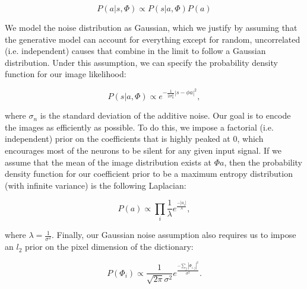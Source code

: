 \begin{equation}\label{eq:ch2_bayes}
    P(a|s,\Phi) \propto P(s|a,\Phi) P(a)
\end{equation}

We model the noise distribution as Gaussian, which we justify by assuming that the generative model can account for everything except for random, uncorrelated (i.e. independent) causes that combine in the limit to follow a Gaussian distribution. Under this assumption, we can specify the probability density function for our image likelihood:

\begin{equation}\label{eq:ch2_image_likelihood}
    P(s|a,\Phi) \propto e^{-\frac{1}{2\sigma_{n}^{2}}|s-\phi a|^{2}},
\end{equation}

\noindent where $\sigma_{n}$ is the standard deviation of the additive noise. Our goal is to encode the images as efficiently as possible. To do this, we impose a factorial (i.e. independent) prior on the coefficients that is highly peaked at 0, which encourages most of the neurons to be silent for any given input signal. If we assume that the mean of the image distribution exists at $\Phi a$, then the probability density function for our coefficient prior to be a maximum entropy distribution (with infinite variance) is the following Laplacian:

\begin{equation}\label{eq:ch2_coefficient_prior}
    P(a) \propto \prod_{i}\frac{1}{\lambda} e^{\frac{-|a_{i}|}{\lambda}},
\end{equation}

\noindent where $\lambda = \tfrac{1}{\sigma^{2}}$. Finally, our Gaussian noise assumption also requires us to impose an $l_{2}$ prior on the pixel dimension of the dictionary:

\begin{equation}\label{eq:ch2_dictionary_prior}
    P(\Phi_{i}) \propto \frac{1}{\sqrt{2\pi}\sigma^{2}}e^{\frac{-\sum_{j}|\Phi_{i,j}|^{2}}{\sigma^{2}}}.
\end{equation}

